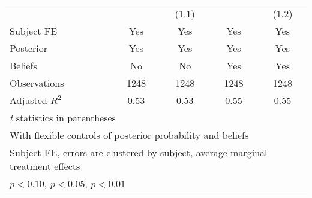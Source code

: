 \begin{table}[htbp]
\begin{tabular}{l*{4}{c}}
                &                  &    (1.1)         &                  &    (1.2)         \\
Subject FE      &      Yes         &      Yes         &      Yes         &      Yes         \\
Posterior       &      Yes         &      Yes         &      Yes         &      Yes         \\
Beliefs         &       No         &       No         &      Yes         &      Yes         \\
\hline
Observations    &     1248         &     1248         &     1248         &     1248         \\
Adjusted \(R^{2}\)&     0.53         &     0.53         &     0.55         &     0.55         \\
\hline\hline
\multicolumn{5}{l}{\footnotesize \textit{t} statistics in parentheses}\\
\multicolumn{5}{l}{\footnotesize With flexible controls of posterior probability and beliefs}\\
\multicolumn{5}{l}{\footnotesize Subject FE, errors are clustered by subject, average marginal treatment effects}\\
\multicolumn{5}{l}{\footnotesize \sym{*} \(p<0.10\), \sym{**} \(p<0.05\), \sym{***} \(p<0.01\)}\\
\end{tabular}
\end{table}

